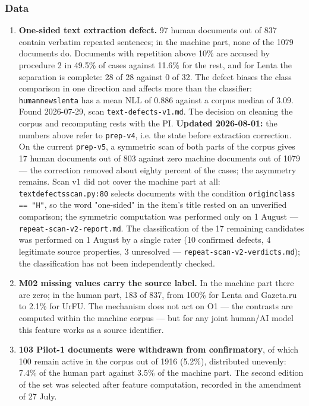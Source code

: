\documentclass[11pt,a4paper]{article}
\renewcommand{\_}{\textunderscore\allowbreak}
\begin{document}
\subsubsection{Data}

\begin{enumerate}
\item[14.] \textbf{One-sided text extraction defect.} 97 human documents out of 837 contain verbatim repeated sentences; in the machine part, none of the 1079 documents do. Documents with repetition above 10\% are accused by procedure 2 in 49.5\% of cases against 11.6\% for the rest, and for Lenta the separation is complete: 28 of 28 against 0 of 32. The defect biases the class comparison in one direction and affects more than the classifier: \texttt{human\_news\_lenta\_0019} has a mean NLL of 0.886 against a corpus median of 3.09. Found 2026-07-29, scan \texttt{text-\allowbreak{}defects-\allowbreak{}v1.md}. The decision on cleaning the corpus and recomputing rests with the PI. \textbf{Updated 2026-08-01:} the numbers above refer to \texttt{prep-\allowbreak{}v4}, i.e. the state before extraction correction. On the current \texttt{prep-\allowbreak{}v5}, a symmetric scan of both parts of the corpus gives 17 human documents out of 803 against zero machine documents out of 1079 — the correction removed about eighty percent of the cases; the asymmetry remains. Scan v1 did not cover the machine part at all: \texttt{text\_defects\_scan.py:80} selects documents with the condition \texttt{origin\_class == "H"}, so the word "one-sided" in the item's title rested on an unverified comparison; the symmetric computation was performed only on 1 August — \texttt{repeat-\allowbreak{}scan-\allowbreak{}v2-\allowbreak{}report.md}. The classification of the 17 remaining candidates was performed on 1 August by a single rater (10 confirmed defects, 4 legitimate source properties, 3 unresolved — \texttt{repeat-\allowbreak{}scan-\allowbreak{}v2-\allowbreak{}verdicts.md}); the classification has not been independently checked.
\item[15.] \textbf{M02 missing values carry the source label.} In the machine part there are zero; in the human part, 183 of 837, from 100\% for Lenta and Gazeta.ru to 2.1\% for UrFU. The mechanism does not act on O1 — the contrasts are computed within the machine corpus — but for any joint human/AI model this feature works as a source identifier.
\item[16.] \textbf{103 Pilot-1 documents were withdrawn from confirmatory}, of which 100 remain active in the corpus out of 1916 (5.2\%), distributed unevenly: 7.4\% of the human part against 3.5\% of the machine part. The second edition of the set was selected after feature computation, recorded in the amendment of 27 July.

\end{enumerate}
\end{document}
